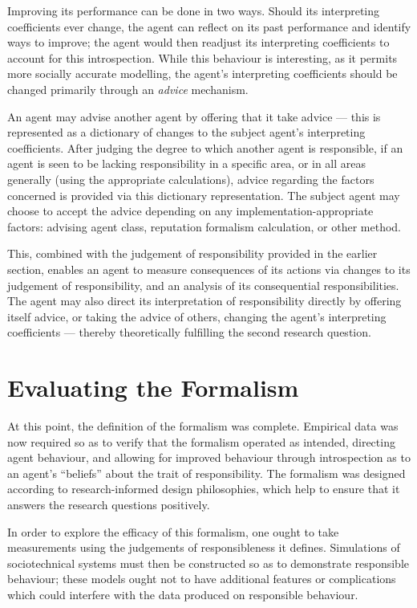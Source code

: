 Improving its performance can be done in two ways. Should its interpreting coefficients ever change, the agent can reflect on its past performance and identify ways to improve; the agent would then readjust its interpreting coefficients to account for this introspection. While this behaviour is interesting, as it permits more socially accurate modelling, the agent's interpreting coefficients should be changed primarily through an \emph{advice} mechanism.\par

An agent may advise another agent by offering that it take advice --- this is represented as a dictionary of changes to the subject agent's interpreting coefficients. After judging the degree to which another agent is responsible, if an agent is seen to be lacking responsibility in a specific area, or in all areas generally (using the appropriate calculations), advice regarding the factors concerned is provided via this dictionary representation. The subject agent may choose to accept the advice depending on any implementation-appropriate factors: advising agent class, reputation formalism calculation, or other method.\par

This, combined with the judgement of responsibility provided in the earlier section, enables an agent to measure consequences of its actions via changes to its judgement of responsibility, and an analysis of its consequential responsibilities. The agent may also direct its interpretation of responsibility directly by offering itself advice, or taking the advice of others, changing the agent's interpreting coefficients --- thereby theoretically fulfilling the second research question.\par


\section{Evaluating the Formalism}\label{sec:evaluation}
At this point, the definition of the formalism was complete. Empirical data was now required so as to verify that the formalism operated as intended, directing agent behaviour, and allowing for improved behaviour through introspection as to an agent's ``beliefs'' about the trait of responsibility. The formalism was designed according to research-informed design philosophies, which help to ensure that it answers the research questions positively.\par

In order to explore the efficacy of this formalism, one ought to take measurements using the judgements of responsibleness it defines. Simulations of sociotechnical systems must then be constructed so as to demonstrate responsible behaviour; these models ought not to have additional features or complications which could interfere with the data produced on responsible behaviour.\par

